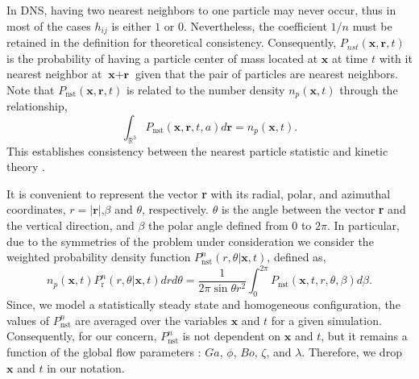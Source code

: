 In DNS, having two nearest neighbors to one particle may never occur, thus in most of the cases $h_{ij}$ is either $1$ or $0$. 
Nevertheless, the coefficient $1/n$ must be retained in the definition for theoretical consistency.
Consequently, $P_{nst}(\textbf{x},\textbf{r},t)$ is the probability of having a particle center of mass located at $\textbf{x}$ at time $t$ with it nearest neighbor at $\textbf{x}+\textbf{r}$ given that the pair of particles are nearest neighbors. 
Note that $P_\text{nst}(\textbf{x},\textbf{r},t)$ is related to the number density $n_p(\textbf{x},t)$ through the relationship, 
\begin{equation*}
    \int_{\mathbb{R}^3}
     P_\text{nst}(\textbf{x},\textbf{r},t,a) d\textbf{r}  = n_p(\textbf{x},t). 
    \label{eq:Pnst}
\end{equation*}
This establishes consistency between the nearest particle statistic and kinetic theory \citep{zhang2021ensemble}. 


It is convenient to represent the vector \textbf{r} with its radial, polar, and azimuthal coordinates,  $r = |\textbf{r}|$,$\beta$ and $\theta$, respectively. $\theta$ is the angle between the vector \textbf{r} and the vertical direction, and $\beta$ the polar angle defined from $0$ to $2\pi$. In particular, due to the symmetries of the problem under consideration we consider the weighted probability density function $P_\text{nst}^n(r,\theta|\textbf{x},t)$, defined as, 
\begin{equation}
    n_p(\textbf{x},t) P_\text{r}^n(r,\theta|\textbf{x},t)dr d\theta 
    =\frac{1}{2\pi \sin\theta r^2 }
    \int_0^{2\pi}
    P_\text{nst}(\textbf{x},t,r,\theta,\beta) 
    d\beta.
    \label{eq:Ptheta_r}
\end{equation}
Since, we model a statistically steady state and homogeneous configuration, the values of $P_\text{nst}^n$ are averaged over the variables $\mathbf{x}$ and $t$ for a given simulation. 
Consequently, for our concern, $P_\text{nst}^n$ is not dependent on $\mathbf{x}$ and $t$, but it remains a function of the global flow parameters :  $Ga$, $\phi$, $Bo$, $\zeta$, and $\lambda$.
Therefore, we drop $\mathbf{x}$ and $t$ in our notation. 


